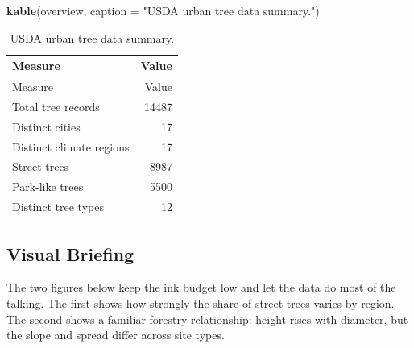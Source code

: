 \documentclass[
  11pt,
]{article}
\newenvironment{Shaded}{\begin{snugshade}}{\end{snugshade}}
\newcommand{\AttributeTok}[1]{\textcolor[rgb]{0.13,0.29,0.53}{#1}}
\newcommand{\FunctionTok}[1]{\textcolor[rgb]{0.13,0.29,0.53}{\textbf{#1}}}
\newcommand{\NormalTok}[1]{#1}
\newcommand{\StringTok}[1]{\textcolor[rgb]{0.31,0.60,0.02}{#1}}
\begin{document}
\begin{Shaded}
\begin{Highlighting}[]
\FunctionTok{kable}\NormalTok{(overview, }\AttributeTok{caption =} \StringTok{"USDA urban tree data summary."}\NormalTok{)}
\end{Highlighting}
\end{Shaded}

\begin{longtable}[]{@{}lr@{}}
\caption{USDA urban tree data summary.}\tabularnewline
\toprule\noalign{}
Measure & Value \\
\midrule\noalign{}
\endfirsthead
\toprule\noalign{}
Measure & Value \\
\midrule\noalign{}
\endhead
\bottomrule\noalign{}
\endlastfoot
Total tree records & 14487 \\
Distinct cities & 17 \\
Distinct climate regions & 17 \\
Street trees & 8987 \\
Park-like trees & 5500 \\
Distinct tree types & 12 \\
\end{longtable}

\subsection{Visual Briefing}\label{visual-briefing}

The two figures below keep the ink budget low and let the data do most
of the talking. The first shows how strongly the share of street trees
varies by region. The second shows a familiar forestry relationship:
height rises with diameter, but the slope and spread differ across site
types.
\end{document}
